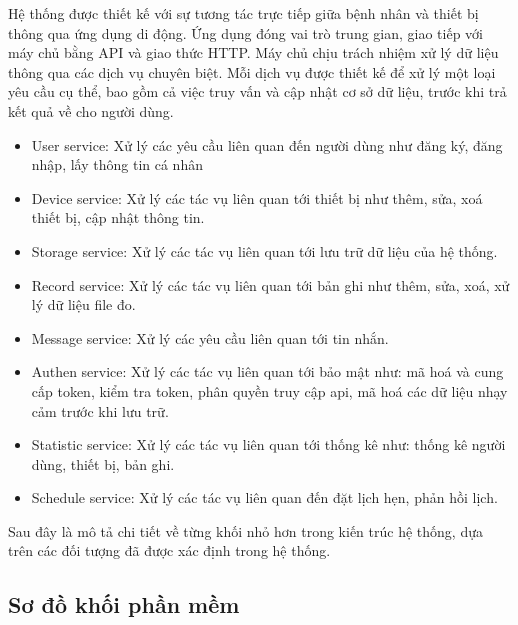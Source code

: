 Hệ thống được thiết kế với sự tương tác trực tiếp giữa bệnh nhân và thiết bị thông qua ứng dụng di động. 
Ứng dụng đóng vai trò trung gian, giao tiếp với máy chủ bằng API và giao thức HTTP. 
Máy chủ chịu trách nhiệm xử lý dữ liệu thông qua các dịch vụ chuyên biệt. 
Mỗi dịch vụ được thiết kế để xử lý một loại yêu cầu cụ thể, bao gồm cả việc truy vấn và cập nhật cơ sở dữ liệu, 
trước khi trả kết quả về cho người dùng.\begin{adjustwidth}{1.5em}{}
\begin{itemize}
  \item User service: Xử lý các yêu cầu liên quan đến người dùng như đăng ký, đăng nhập, lấy thông tin cá nhân
  \item Device service: Xử lý các tác vụ liên quan tới thiết bị như thêm, sửa, xoá thiết bị, cập nhật thông tin.
  \item Storage service: Xử lý các tác vụ liên quan tới lưu trữ dữ liệu của hệ thống.
  \item Record service: Xử lý các tác vụ liên quan tới bản ghi như thêm, sửa, xoá, xử lý dữ liệu file đo.
  \item Message service: Xử lý các yêu cầu liên quan tới tin nhắn.
  \item Authen service: Xử lý các tác vụ liên quan tới bảo mật như: mã hoá và cung cấp token, kiểm tra token, phân quyền truy cập api, mã hoá các dữ liệu nhạy cảm trước khi lưu trữ.
  \item Statistic service: Xử lý các tác vụ liên quan tới thống kê như: thống kê người dùng, thiết bị, bản ghi.
  \item Schedule service: Xử lý các tác vụ liên quan đến đặt lịch hẹn, phản hồi lịch.
\end{itemize}
\end{adjustwidth}

Sau đây là mô tả chi tiết về từng khối nhỏ hơn trong kiến trúc hệ thống, dựa trên các đối tượng đã được xác định trong hệ thống.
\newpage
\subsection{Sơ đồ khối phần mềm}

